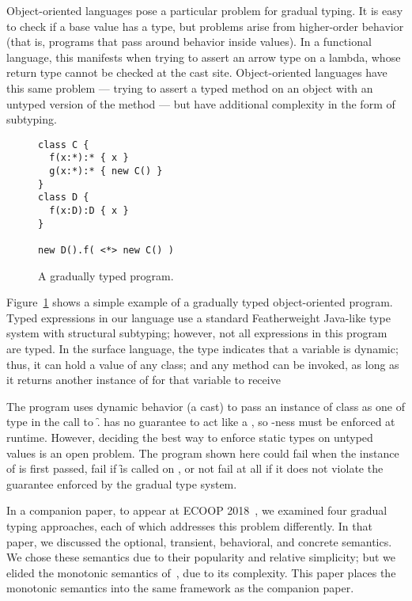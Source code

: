 \documentclass[sigconf]{acmart}
\begin{document}
Object-oriented languages pose a particular problem for gradual typing. It is
easy to check if a base value has a type, but problems arise from higher-order
behavior (that is, programs that pass around behavior inside values). In a
functional language, this manifests when trying to assert an arrow type on a
lambda, whose return type cannot be checked at the cast site. Object-oriented
languages have this same problem --- trying to assert a typed method on an
object with an untyped version of the method --- but have additional complexity
in the form of subtyping.

\begin{figure}[h]
\begin{lstlisting}
class C { 
  f(x:*):* { x } 
  g(x:*):* { new C() }
}
class D { 
  f(x:D):D { x }
}

new D().f( <*> new C() )
\end{lstlisting}
\caption{A gradually typed program.}
\label{fig:simpleprog}
\end{figure}

Figure~\ref{fig:simpleprog} shows a simple example of a gradually typed
object-oriented program. Typed expressions in our language use a standard
Featherweight Java-like type system with structural subtyping; however, not
all expressions in this program are typed. In the surface language, the type
\any indicates that a variable is dynamic; thus, it can hold a value of any
class; and any method can be invoked, as long as it returns another instance
of \any for that variable to receive

The program uses dynamic behavior (a cast) to pass an instance of class \C as
one of type \D in the call to \f. \C has no guarantee to act like a \D, so
\D-ness must be enforced at runtime. However, deciding the best way to enforce
static types on untyped values is an open problem. The program shown here
could fail when the instance of \C is first passed, fail if \f is called on
\x, or not fail at all if it does not violate the guarantee enforced by the
gradual type system.

In a companion paper, to appear at ECOOP 2018~\cite{us}, we examined four
gradual typing approaches, each of which addresses this problem differently.
In that paper, we discussed the optional, transient, behavioral, and concrete
semantics. We chose these semantics due to their popularity and relative
simplicity; but we elided the monotonic semantics of~\cite{siek14}, due to its
complexity. This paper places the monotonic semantics into the same framework
as the companion paper.
\end{document}
